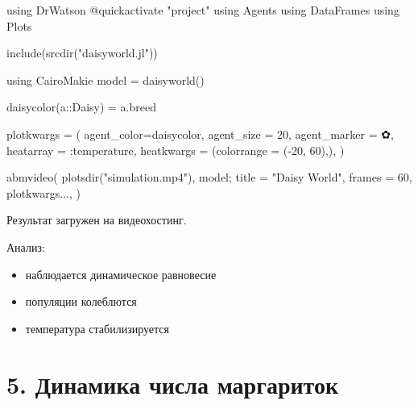\documentclass[
  english,
  russian,
  12pt,
  a4paper,
  DIV=11,
  numbers=noendperiod]{scrreprt}
\newenvironment{Shaded}{\begin{snugshade}}{\end{snugshade}}
\newcommand{\BuiltInTok}[1]{\textcolor[rgb]{0.00,0.23,0.31}{#1}}
\newcommand{\CharTok}[1]{\textcolor[rgb]{0.13,0.47,0.30}{#1}}
\newcommand{\DataTypeTok}[1]{\textcolor[rgb]{0.68,0.00,0.00}{#1}}
\newcommand{\FloatTok}[1]{\textcolor[rgb]{0.68,0.00,0.00}{#1}}
\newcommand{\FunctionTok}[1]{\textcolor[rgb]{0.28,0.35,0.67}{#1}}
\newcommand{\ImportTok}[1]{\textcolor[rgb]{0.00,0.46,0.62}{#1}}
\newcommand{\NormalTok}[1]{\textcolor[rgb]{0.00,0.23,0.31}{#1}}
\newcommand{\OperatorTok}[1]{\textcolor[rgb]{0.37,0.37,0.37}{#1}}
\newcommand{\PreprocessorTok}[1]{\textcolor[rgb]{0.68,0.00,0.00}{#1}}
\newcommand{\StringTok}[1]{\textcolor[rgb]{0.13,0.47,0.30}{#1}}
\providecommand{\tightlist}{%
  \setlength{\itemsep}{0pt}\setlength{\parskip}{0pt}}
\begin{document}
\begin{Shaded}
\begin{Highlighting}[]
\ImportTok{using} \BuiltInTok{DrWatson}
\PreprocessorTok{@quickactivate} \StringTok{"project"}
\ImportTok{using} \BuiltInTok{Agents}
\ImportTok{using} \BuiltInTok{DataFrames}
\ImportTok{using} \BuiltInTok{Plots}

\FunctionTok{include}\NormalTok{(}\FunctionTok{srcdir}\NormalTok{(}\StringTok{"daisyworld.jl"}\NormalTok{))}

\ImportTok{using} \BuiltInTok{CairoMakie}
\NormalTok{model }\OperatorTok{=} \FunctionTok{daisyworld}\NormalTok{()}

\FunctionTok{daisycolor}\NormalTok{(a}\OperatorTok{::}\DataTypeTok{Daisy}\NormalTok{) }\OperatorTok{=}\NormalTok{ a.breed}

\NormalTok{plotkwargs }\OperatorTok{=}\NormalTok{ (}
\NormalTok{    agent\_color}\OperatorTok{=}\NormalTok{daisycolor, agent\_size }\OperatorTok{=} \FloatTok{20}\NormalTok{, agent\_marker }\OperatorTok{=} \CharTok{\textquotesingle{}✿\textquotesingle{}}\NormalTok{,}
\NormalTok{    heatarray }\OperatorTok{=} \OperatorTok{:}\NormalTok{temperature,}
\NormalTok{    heatkwargs }\OperatorTok{=}\NormalTok{ (colorrange }\OperatorTok{=}\NormalTok{ (}\OperatorTok{{-}}\FloatTok{20}\NormalTok{, }\FloatTok{60}\NormalTok{),),}
\NormalTok{)}

\FunctionTok{abmvideo}\NormalTok{(}
    \FunctionTok{plotsdir}\NormalTok{(}\StringTok{"simulation.mp4"}\NormalTok{),}
\NormalTok{    model;}
\NormalTok{    title }\OperatorTok{=} \StringTok{"Daisy World"}\NormalTok{,}
\NormalTok{    frames }\OperatorTok{=} \FloatTok{60}\NormalTok{,}
\NormalTok{    plotkwargs}\OperatorTok{...}\NormalTok{,}
\NormalTok{)}
\end{Highlighting}
\end{Shaded}

Результат загружен на видеохостинг.

Анализ:

\begin{itemize}
\tightlist
\item
  наблюдается динамическое равновесие
\item
  популяции колеблются
\item
  температура стабилизируется
\end{itemize}

\section{5. Динамика числа
маргариток}\label{ux434ux438ux43dux430ux43cux438ux43aux430-ux447ux438ux441ux43bux430-ux43cux430ux440ux433ux430ux440ux438ux442ux43eux43a}
\end{document}
